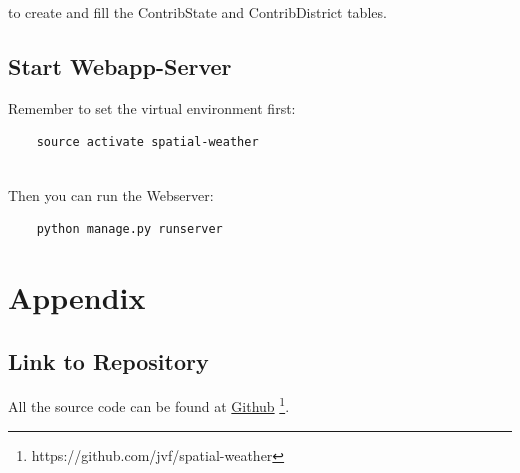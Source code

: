 \documentclass[paper=a4, fontsize=11pt]{article} %
\numberwithin{equation}{section} %
\numberwithin{figure}{section} %
\numberwithin{table}{section} %
\begin{document}
to create and fill the ContribState and ContribDistrict tables.


\subsection{Start Webapp-Server}

Remember to set the virtual environment first:

\begin{lstlisting}
	source activate spatial-weather
\end{lstlisting}

\ \\
Then you can run the Webserver:
\begin{lstlisting}
	python manage.py runserver
\end{lstlisting}


\clearpage
{}
\printbibliography[heading=bibintoc, title=Bibliography]

\clearpage
\section{Appendix}

\subsection{Link to Repository}

All the source code can be found at \href{https://github.com/jvf/spatial-weather}{Github} \footnote{https://github.com/jvf/spatial-weather}.
\end{document}

